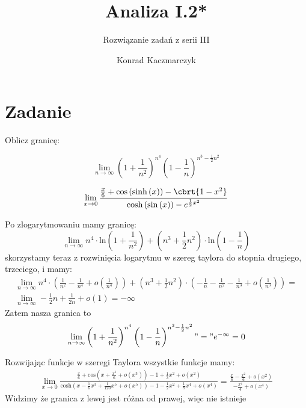 \documentclass[12pt]{scrartcl}
\author{Konrad Kaczmarczyk}
\begin{document}
  \title{Analiza I.2*}
  \subtitle{Rozwiązanie zadań z serii III}
  \maketitle

  \section{Zadanie}
      
  \begin{zadanie}
      Oblicz granicę:
      \begin{walk}
        \item $$ \lim_{n \to \infty } \left ( 1 + \frac{1}{n^2} \right )^{n^4} \left ( 1 - \frac{1}{n} \right )^{n^3 - \frac{1}{2} n^2} $$
        \item $$ \lim_{x \to 0} \frac{\frac{x}{6} + \text{cos} \left ( \text{sinh} \left ( x \right )  \right ) - \cbrt{1 - x^2}  }{ \text{cosh} \left ( \text{sin} \left ( x \right )  \right ) - e^{\frac{1}{2} x^2}} $$ 
      \end{walk}
  \end{zadanie}
      
      \begin{walk}
          \item Po zlogarytmowaniu mamy granicę:
            \[
                \lim_{n \to \infty } n^4 \cdot  \text{ln} \left ( 1 + \frac{1}{n^2} \right ) + \left ( n^3 + \frac{1}{2} n^2 \right ) \cdot \text{ln} \left ( 1 - \frac{1}{n} \right ) 
            \]
           skorzystamy teraz z rozwinięcia logarytmu w szereg taylora do stopnia drugiego, trzeciego, i mamy:
           \begin{gather*}
              \lim_{n \to \infty } n^4 \cdot \left ( \frac{1}{n^2} - \frac{1}{n^4} + o(\frac{1}{n^4}) \right ) + \left ( n^3 + \frac{1}{2} n^2 \right ) \cdot \left ( - \frac{1}{n} - \frac{1}{n^2} - \frac{1}{n^3} + o(\frac{1}{n^3}) \right ) = \\
              \lim_{n \to \infty } - \frac{1}{2} n + \frac{1}{2n} + o(1) = - \infty  
           \end{gather*}
           Zatem nasza granica to
           \[
             \lim_{n \to \infty } \left ( 1 + \frac{1}{n^2} \right )^{n^4} \left ( 1 - \frac{1}{n} \right )^{n^3 - \frac{1}{2} n^2} "=" e^{- \infty } = 0
           \]
          \item Rozwijając funkcje w szeregi Taylora wszystkie funkcje mamy:
            \begin{gather*}
                \lim_{x \to 0} \frac{\frac{x}{6} + \text{cos} \left ( x + \frac{x^3}{6} + o(x^3) \right ) - 1 + \frac{1}{3} x^2 + o(x^2)}{ \text{cosh} \left ( x - \frac{1}{6} x^3 + \frac{1}{120} x^5 + o(x^5) \right ) - 1 - \frac{1}{2} x^2 + \frac{1}{8} x^4 + o(x^4)} = \frac{\frac{x}{6} - \frac{x^2}{6} + o(x^2)}{- \frac{x^4}{4} + o(x^4)}
            \end{gather*}
            Widzimy że granica z lewej jest różna od prawej, więc nie istnieje 
      \end{walk}
    
\end{document}
